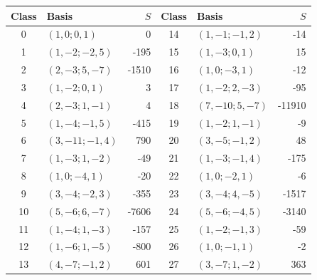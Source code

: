 \begin{center}\small
\begin{tabular}{clr@{\qquad}clr}
\toprule
Class & Basis & \(S\) & Class & Basis & \(S\)\\
\midrule
0 & \((1,0;0,1)\) & 0 & 14 & \((1,-1;-1,2)\) & -14\\
1 & \((1,-2;-2,5)\) & -195 & 15 & \((1,-3;0,1)\) & 15\\
2 & \((2,-3;5,-7)\) & -1510 & 16 & \((1,0;-3,1)\) & -12\\
3 & \((1,-2;0,1)\) & 3 & 17 & \((1,-2;2,-3)\) & -95\\
4 & \((2,-3;1,-1)\) & 4 & 18 & \((7,-10;5,-7)\) & -11910\\
5 & \((1,-4;-1,5)\) & -415 & 19 & \((1,-2;1,-1)\) & -9\\
6 & \((3,-11;-1,4)\) & 790 & 20 & \((3,-5;-1,2)\) & 48\\
7 & \((1,-3;1,-2)\) & -49 & 21 & \((1,-3;-1,4)\) & -175\\
8 & \((1,0;-4,1)\) & -20 & 22 & \((1,0;-2,1)\) & -6\\
9 & \((3,-4;-2,3)\) & -355 & 23 & \((3,-4;4,-5)\) & -1517\\
10 & \((5,-6;6,-7)\) & -7606 & 24 & \((5,-6;-4,5)\) & -3140\\
11 & \((1,-4;1,-3)\) & -157 & 25 & \((1,-2;-1,3)\) & -59\\
12 & \((1,-6;1,-5)\) & -800 & 26 & \((1,0;-1,1)\) & -2\\
13 & \((4,-7;-1,2)\) & 601 & 27 & \((3,-7;1,-2)\) & 363\\
\bottomrule
\end{tabular}
\end{center}
